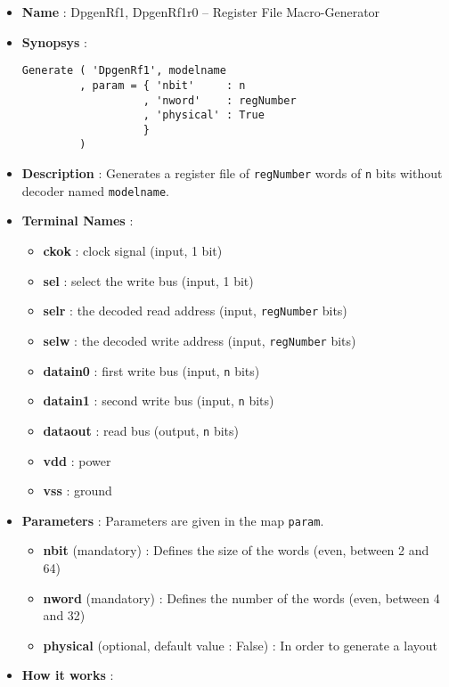 \begin{itemize}
    \item \textbf{Name} : DpgenRf1, DpgenRf1r0 -- Register File Macro-Generator
    \item \textbf{Synopsys} :
\begin{verbatim}
Generate ( 'DpgenRf1', modelname
         , param = { 'nbit'     : n
                   , 'nword'    : regNumber
                   , 'physical' : True                   
                   }
         )
\end{verbatim}
    \item \textbf{Description} : Generates a register file of \verb-regNumber- words of \verb-n- bits without decoder named \verb-modelname-.
    \item \textbf{Terminal Names} :
    \begin{itemize}
        \item \textbf{ckok} : clock signal (input, 1 bit)
        \item \textbf{sel} : select the write bus (input, 1 bit)
        \item \textbf{selr} : the decoded read address (input, \verb-regNumber- bits)
        \item \textbf{selw} : the decoded write address (input, \verb-regNumber- bits)
        \item \textbf{datain0} : first write bus (input, \verb-n- bits)
        \item \textbf{datain1} : second write bus (input, \verb-n- bits)
        \item \textbf{dataout} : read bus (output, \verb-n- bits)
        \item \textbf{vdd} : power
        \item \textbf{vss} : ground
    \end{itemize}
    \item \textbf{Parameters} : Parameters are given in the map \verb-param-.
    \begin{itemize}
        \item \textbf{nbit} (mandatory) : Defines the size of the words  (even, between 2 and 64)
        \item \textbf{nword} (mandatory) : Defines the number of the words (even, between 4 and 32)
        \item \textbf{physical} (optional, default value : False) : In order to generate a layout    
    \end{itemize}
    \item \textbf{How it works} :

\end{itemize}

